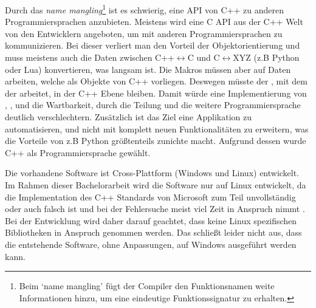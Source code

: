       Durch das \emph{name mangling}\footnote{
        Beim `name mangling' fügt der Compiler den Funktionsnamen weite Informationen hinzu, um eine eindeutige Funktionssignatur zu erhalten.
      } ist es schwierig, eine API von C++ zu anderen Programmiersprachen anzubieten. Meistens wird eine C API aus der C++ Welt von den Entwicklern angeboten, um mit anderen Programmiersprachen zu kommunizieren. Bei dieser verliert man den Vorteil der Objektorientierung und muss meistens auch die Daten zwischen C++$\longleftrightarrow$C und C$\longleftrightarrow$XYZ (z.B Python oder Lua) konvertieren, was langsam ist. Die Makros müssen aber auf Daten arbeiten, welche als Objekte von C++ vorliegen. Deswegen müsste der , mit dem der  arbeitet, in der C++ Ebene bleiben. Damit würde eine Implementierung von , ,  und  die Wartbarkeit, durch die Teilung und die weitere Programmiersprache deutlich verschlechtern. Zusätzlich ist das Ziel eine Applikation zu automatisieren, und nicht mit komplett neuen Funktionalitäten zu erweitern, was die Vorteile von z.B Python größtenteils zunichte macht. Aufgrund dessen wurde C++ als Programmiersprache gewählt.

      Die vorhandene Software ist Cross-Plattform (Windows und Linux) entwickelt. Im Rahmen dieser Bachelorarbeit wird die Software nur auf Linux entwickelt, da die Implementation des C++ Standards von Microsoft zum Teil unvollständig oder auch falsch ist und bei der Fehlersuche meist viel Zeit in Anspruch nimmt \autocite{new-ms-compiler}. Bei der Entwicklung wird daher darauf geachtet, dass keine Linux spezifischen Bibliotheken in Anspruch genommen werden. Das schließt leider nicht aus, dass die entstehende Software, ohne Anpassungen, auf Windows ausgeführt werden kann.

